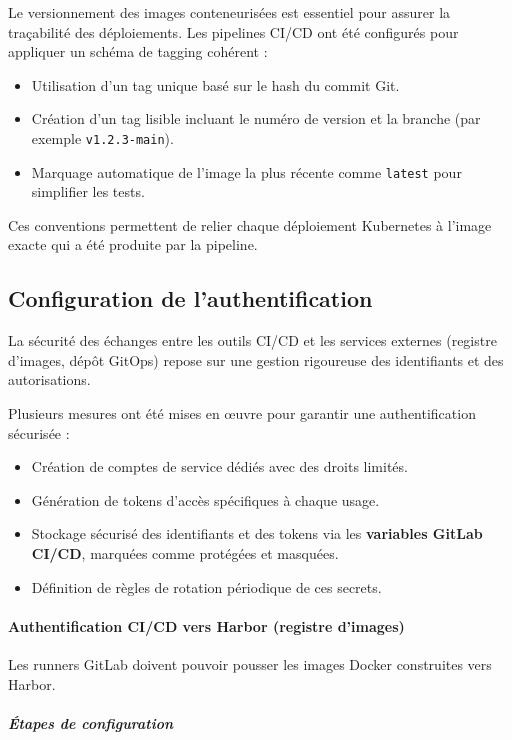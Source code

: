 Le versionnement des images conteneurisées est essentiel pour assurer la traçabilité des déploiements.
Les pipelines CI/CD ont été configurés pour appliquer un schéma de tagging cohérent :
\begin{itemize}
	\item Utilisation d’un tag unique basé sur le hash du commit Git.
	\item Création d’un tag lisible incluant le numéro de version et la branche (par exemple \texttt{v1.2.3-main}).
	\item Marquage automatique de l’image la plus récente comme \texttt{latest} pour simplifier les tests.
\end{itemize}

Ces conventions permettent de relier chaque déploiement Kubernetes à l’image exacte qui a été produite par la pipeline.

\subsection{Configuration de l’authentification}

La sécurité des échanges entre les outils CI/CD et les services externes (registre d’images, dépôt GitOps) repose sur une gestion rigoureuse des identifiants et des autorisations.

Plusieurs mesures ont été mises en œuvre pour garantir une authentification sécurisée :
\begin{itemize}
	\item Création de comptes de service dédiés avec des droits limités.
	\item Génération de tokens d’accès spécifiques à chaque usage.
	\item Stockage sécurisé des identifiants et des tokens via les \textbf{variables GitLab CI/CD}, marquées comme protégées et masquées.
	\item Définition de règles de rotation périodique de ces secrets.
\end{itemize}

\paragraph{Authentification CI/CD vers Harbor (registre d’images)}

Les runners GitLab doivent pouvoir pousser les images Docker construites vers Harbor.

\subparagraph{Étapes de configuration}

